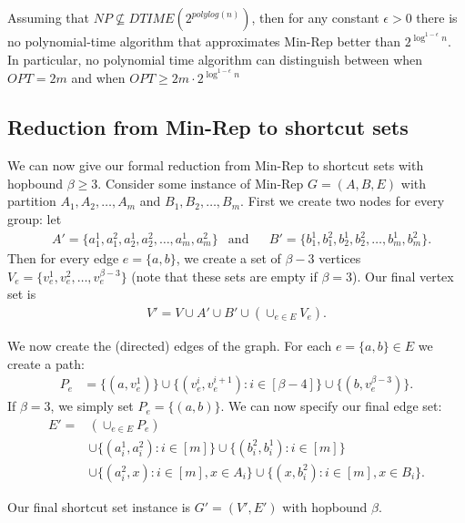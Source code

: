 \begin{theorem} \label{thm:MinRep-hardness}
    Assuming that $NP \not\subseteq DTIME(2^{polylog(n)})$, then for any constant $\epsilon > 0$ there is no polynomial-time algorithm that approximates Min-Rep better than $2^{\log^{1-\epsilon} n}$.  In particular, no polynomial time algorithm can distinguish between when $OPT = 2m$ and when $OPT \geq 2m \cdot 2^{\log^{1-\epsilon} n}$
\end{theorem}


\subsection{Reduction from Min-Rep to shortcut sets}
We can now give our formal reduction from Min-Rep to shortcut sets with hopbound $\beta \geq 3$.  Consider some instance of Min-Rep $G = (A, B, E)$ with partition $A_1, A_2, \dots, A_m$ and $B_1, B_2, \dots, B_m$.  First we create two nodes for every group: let 
\begin{align*}
&A' = \{a_1^1, a_1^2, a_2^1, a_2^2, \dots, a_m^1, a_m^2\} & \text{and} &  &B' = \{b_1^1, b_1^2, b_2^1,b_2^2, \dots, b_m^1, b_m^2\}.
\end{align*}
Then for every edge $e = \{a, b\}$, we create a set of $\beta - 3$ vertices $V_e = \{v_e^1, v_e^2, \dots, v_e^{\beta-3}\}$ (note that these sets are empty if $\beta=3$).  Our final vertex set is 
\begin{align*}
    V' = V \cup A' \cup B' \cup (\cup_{e \in E} V_e).
\end{align*}

We now create the (directed) edges of the graph.  For each $e = \{a,b\} \in E$ we create a path:
\begin{align*}
    P_e &= \{(a, v_e^1)\} \cup \{(v_e^i, v_e^{i+1}) : i \in [\beta-4]\} \cup \{(b, v_e^{\beta-3})\}.
\end{align*}
If $\beta = 3$, we simply set $P_e = \{(a,b)\}$.  We can now specify our final edge set:
\begin{align*}
    E' = &\left(\cup_{e \in E} P_e\right) \\
    &\cup \{(a_i^1, a_i^2) : i \in [m]\} \cup \{(b_i^2, b_i^1) : i \in [m]\} \\
    &\cup \{(a_i^2, x) : i \in [m], x \in A_i\} \cup \{(x, b_i^2) : i \in [m], x \in B_i\}.
\end{align*}

Our final shortcut set instance is $G' = (V', E')$ with hopbound $\beta$.

